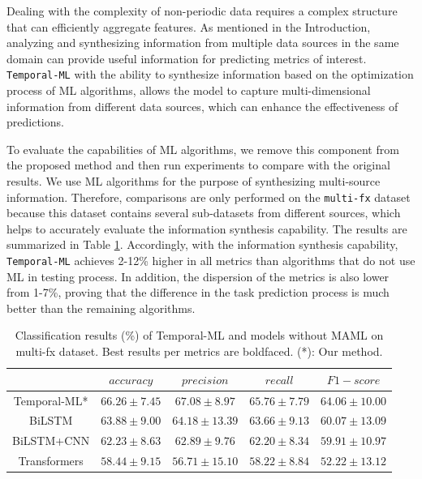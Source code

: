 \documentclass[a4paper,fleqn]{cas-sc}
\begin{document}
\vspace{1mm}

Dealing with the complexity of non-periodic data requires a complex structure that can efficiently aggregate features. As mentioned in the Introduction, analyzing and synthesizing information from multiple data sources in the same domain can provide useful information for predicting metrics of interest. \verb|Temporal-ML| with the ability to synthesize information based on the optimization process of ML algorithms, allows the model to capture multi-dimensional information from different data sources, which can enhance the effectiveness of predictions.

\vspace{1mm}

To evaluate the capabilities of ML algorithms, we remove this component from the proposed method and then run experiments to compare with the original results. We use ML algorithms for the purpose of synthesizing multi-source information. Therefore, comparisons are only performed on the \verb|multi-fx| dataset because this dataset contains several sub-datasets from different sources, which helps to accurately evaluate the information synthesis capability. The results are summarized in Table \ref{tab:ab_ml}. Accordingly, with the information synthesis capability, \verb|Temporal-ML| achieves 2-12\% higher in all metrics than algorithms that do not use ML in testing process. In addition, the dispersion of the metrics is also lower from 1-7\%, proving that the difference in the task prediction process is much better than the remaining algorithms.

\vspace{1mm}

\begin{table}[H]
    \centering
    \caption{Classification results (\%) of Temporal-ML and models without MAML on multi-fx dataset. Best results per metrics are boldfaced. (\mbox{*}): Our method.}
    \label{tab:ab_ml}
    \begin{tabular}{c|cccc} 
    \toprule
                                & $accuracy$              & $precision$             & $recall$                & $F1-score$                \\ 
    \hline
    Temporal-ML\mbox{*}  & $\mathbf{66.26\pm7.45}$ & $\mathbf{67.08\pm8.97}$ & $\mathbf{65.76\pm7.79}$ & $\mathbf{64.06\pm10.00}$  \\
    BiLSTM               & $63.88\pm9.00$          & $64.18\pm13.39$         & $63.66\pm9.13$          & $60.07\pm13.09$           \\
    BiLSTM+CNN           & $62.23\pm8.63$          & $62.89\pm9.76$          & $62.20\pm8.34$          & $59.91\pm10.97$           \\
    Transformers         & $58.44\pm9.15$          & $56.71\pm15.10$         & $58.22\pm8.84$          & $52.22\pm13.12$           \\
    \bottomrule
    \end{tabular}
\end{table}
\end{document}
